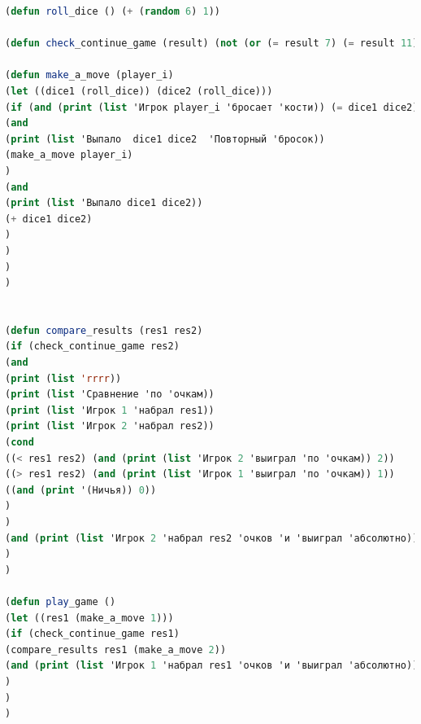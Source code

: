 \documentclass[12pt]{report}
\begin{document}
\begin{lstlisting}[language=Lisp]
(defun roll_dice () (+ (random 6) 1))

(defun check_continue_game (result) (not (or (= result 7) (= result 11))))

(defun make_a_move (player_i) 
(let ((dice1 (roll_dice)) (dice2 (roll_dice)))
(if (and (print (list 'Игрок player_i 'бросает 'кости)) (= dice1 dice2) (or (= dice1 1) (= dice1 6)))
(and 
(print (list 'Выпало  dice1 dice2  'Повторный 'бросок)) 
(make_a_move player_i)
)
(and 
(print (list 'Выпало dice1 dice2))
(+ dice1 dice2)
)
)
)
)


(defun compare_results (res1 res2) 
(if (check_continue_game res2)
(and
(print (list 'rrrr))
(print (list 'Сравнение 'по 'очкам))
(print (list 'Игрок 1 'набрал res1))
(print (list 'Игрок 2 'набрал res2))
(cond 
((< res1 res2) (and (print (list 'Игрок 2 'выиграл 'по 'очкам)) 2))
((> res1 res2) (and (print (list 'Игрок 1 'выиграл 'по 'очкам)) 1))
((and (print '(Ничья)) 0))
)
)	
(and (print (list 'Игрок 2 'набрал res2 'очков 'и 'выиграл 'абсолютно)) 2)
)
)

(defun play_game () 
(let ((res1 (make_a_move 1)))
(if (check_continue_game res1)
(compare_results res1 (make_a_move 2))
(and (print (list 'Игрок 1 'набрал res1 'очков 'и 'выиграл 'абсолютно)) 1)
)
)
)

\end{lstlisting}

	

	
\end{document}
